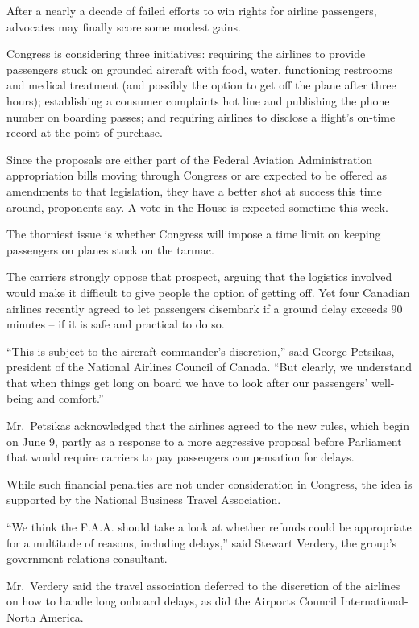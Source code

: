 \documentclass[12pt,a4paper,onecolumn]{article}
\begin{document}
After a nearly a decade of failed efforts to win rights for airline passengers, advocates may
finally score some modest gains.

Congress is considering three initiatives: requiring the airlines to provide passengers stuck on
grounded aircraft with food, water, functioning restrooms and medical treatment (and possibly the
option to get off the plane after three hours); establishing a consumer complaints hot line and
publishing the phone number on boarding passes; and requiring airlines to disclose a flight's
on-time record at the point of purchase.

Since the proposals are either part of the Federal Aviation Administration appropriation bills
moving through Congress or are expected to be offered as amendments to that legislation, they have a
better shot at success this time around, proponents say. A vote in the House is expected sometime
this week.

The thorniest issue is whether Congress will impose a time limit on keeping passengers on planes
stuck on the tarmac.

The carriers strongly oppose that prospect, arguing that the logistics involved would make it
difficult to give people the option of getting off. Yet four Canadian airlines recently agreed to
let passengers disembark if a ground delay exceeds 90 minutes -- if it is safe and practical to do
so.

``This is subject to the aircraft commander's discretion,'' said George Petsikas, president of the
National Airlines Council of Canada. ``But clearly, we understand that when things get long on board
we have to look after our passengers' well-being and comfort.''

Mr.~Petsikas acknowledged that the airlines agreed to the new rules, which begin on June 9, partly
as a response to a more aggressive proposal before Parliament that would require carriers to pay
passengers compensation for delays.

While such financial penalties are not under consideration in Congress, the idea is supported by the
National Business Travel Association.

``We think the F.A.A. should take a look at whether refunds could be appropriate for a multitude of
reasons, including delays,'' said Stewart Verdery, the group's government relations consultant.

Mr.~Verdery said the travel association deferred to the discretion of the airlines on how to handle
long onboard delays, as did the Airports Council International-North America.
\end{document}
